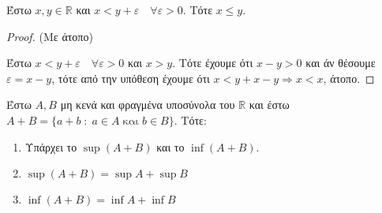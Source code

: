 \begin{lem}
  \label{lem:vare2}
  Έστω $ x,y \in \mathbb{R} $ και $ x<y+ \varepsilon \quad \forall \varepsilon >0 $. 
  Τότε $ x \leq y $.
\end{lem}
\begin{proof}(Με άτοπο)
\item {}
  Έστω $ x < y+ \varepsilon \quad \forall \varepsilon >0 $ και $ x>y $. Τότε 
  έχουμε ότι $ x-y>0 $ και άν θέσουμε  $ \varepsilon = x-y $, τότε από την 
  υπόθεση έχουμε ότι $ x< y+ x-y \Rightarrow x<x $, άτοπο.
\end{proof}

\begin{mybox3}
\begin{prop}
  Έστω $ A,B $ μη κενά και φραγμένα υποσύνολα του $ \mathbb{R} $ και έστω 
  $ A+B= \{ a+b \; : \; a \in A \; \text{και} \; b \in B \} $.
  Τότε:
  \begin{enumerate}
    \item Υπάρχει το $ \sup (A+B) $ και το $ \inf (A+B) $.
    \item $ \sup {(A+B)}= \sup A + \sup B $
    \item $ \inf {(A+B)}= \inf A + \inf B $
  \end{enumerate}
\end{prop}
\end{mybox3}
